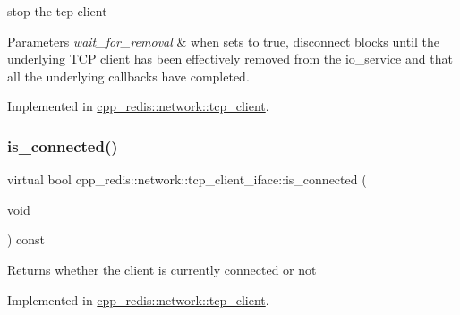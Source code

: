 stop the tcp client


\begin{DoxyParams}{Parameters}
{\em wait\+\_\+for\+\_\+removal} & when sets to true, disconnect blocks until the underlying T\+CP client has been effectively removed from the io\+\_\+service and that all the underlying callbacks have completed. \\
\hline
\end{DoxyParams}


Implemented in \hyperlink{classcpp__redis_1_1network_1_1tcp__client_a88f49c4e32d59855a62296fb74136a44}{cpp\+\_\+redis\+::network\+::tcp\+\_\+client}.

\mbox{\label{classcpp__redis_1_1network_1_1tcp__client__iface_a41ad0b43e3ab172828a3d2ce55d23893}} 
\subsubsection{\texorpdfstring{is\+\_\+connected()}{is\_connected()}}
{\footnotesize\ttfamily virtual bool cpp\+\_\+redis\+::network\+::tcp\+\_\+client\+\_\+iface\+::is\+\_\+connected (\begin{DoxyParamCaption}\item[{void}]{ }\end{DoxyParamCaption}) const\hspace{0.3cm}{\ttfamily [pure virtual]}}

\begin{DoxyReturn}{Returns}
whether the client is currently connected or not 
\end{DoxyReturn}


Implemented in \hyperlink{classcpp__redis_1_1network_1_1tcp__client_a0a636ca6bd59425bf22416a1c7694f65}{cpp\+\_\+redis\+::network\+::tcp\+\_\+client}.

\mbox{\label{classcpp__redis_1_1network_1_1tcp__client__iface_acecf3b75c3849071d82478bc7a8c97a8}} 
